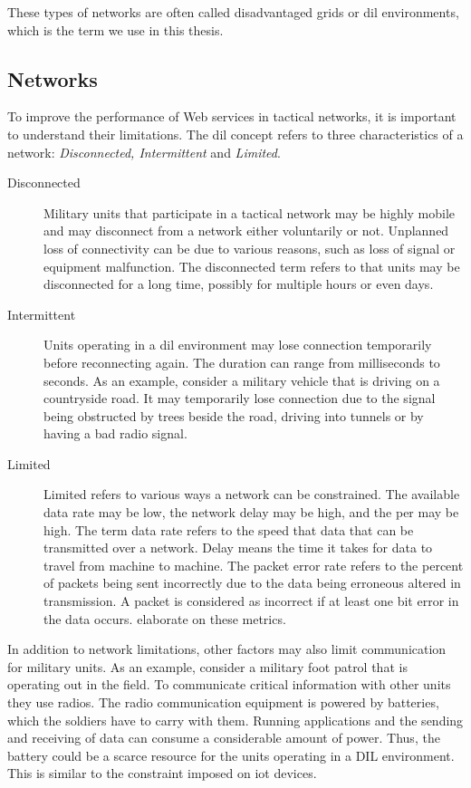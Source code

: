 These types of networks are often called disadvantaged grids or \gls{dil}
environments, which is the term we use in this thesis.

\subsection{ Networks}
\label{dil}

To improve the performance of Web services in tactical networks, it is important
to understand their limitations. The \gls{dil} concept refers to three
characteristics of a network: \textit{Disconnected, Intermittent} and
\textit{Limited}.

\begin{description}
\item[Disconnected]

Military units that participate in a tactical network may be highly mobile and
may disconnect from a network either voluntarily or not. Unplanned loss of
connectivity can be due to various reasons, such as loss of signal or equipment
malfunction. The disconnected term refers to that units may be disconnected for
a long time, possibly for multiple hours or even days.

\item[Intermittent]

Units operating in a \gls{dil} environment may lose connection temporarily
before reconnecting again. The duration can range from milliseconds to seconds.
As an example, consider a military vehicle that is driving on a countryside
road. It may temporarily lose connection due to the signal being obstructed by
trees beside the road, driving into tunnels or by having a bad radio signal.

\item[Limited] Limited refers to various ways a network can be constrained. The
available data rate may be low, the network delay may be high, and the \gls{per}
may be high. The term data rate refers to the speed that data that can be
transmitted over a network. Delay means the time it takes for data to travel
from machine to machine. The packet error rate refers to the percent of packets
being sent incorrectly due to the data being erroneous altered in transmission.
A packet is considered as incorrect if at least one bit error in the data
occurs.  elaborate on these metrics.

\end{description}

In addition to network limitations, other factors may also limit communication
for military units. As an example, consider a military foot patrol that is
operating out in the field. To communicate critical information with other units
they use radios. The radio communication equipment is powered by batteries,
which the soldiers have to carry with them. Running applications and the sending
and receiving of data can consume a considerable amount of power. Thus, the
battery could be a scarce resource for the units operating in a DIL environment.
This is similar to the constraint imposed on \gls{iot} devices.


